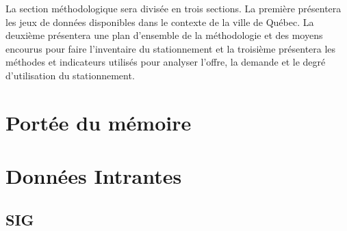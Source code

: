 \label{sec:Methodologie}
La section méthodologique sera divisée en trois sections. La première présentera les jeux de données disponibles dans le contexte de la ville de Québec. La deuxième présentera une plan d'ensemble de la méthodologie et des moyens encourus pour faire l'inventaire du stationnement et la troisième présentera les méthodes et indicateurs utilisés pour analyser l'offre, la demande et le degré d'utilisation du stationnement.

\section{Portée du mémoire}
\section{Données Intrantes}
  \subsection{\ac{SIG}}
